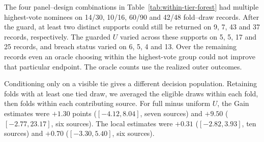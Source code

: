 The four panel--design combinations in Table~\ref{tab:within-tier-forest} had multiple highest-vote nominees on 14/30, 10/16, 60/90 and 42/48 fold--draw records. After the guard, at least two distinct supports could still be returned on 9, 7, 43 and 37 records, respectively. The guarded $U$ varied across these supports on 5, 5, 17 and 25 records, and breach status varied on 6, 5, 4 and 13. Over the remaining records even an oracle choosing within the highest-vote group could not improve that particular endpoint. The oracle counts use the realized outer outcomes.

Conditioning only on a visible tie gives a different decision population. Retaining folds with at least one tied draw, we averaged the eligible draws within each fold, then folds within each contributing source. For full minus uniform $U$, the Gain estimates were $+1.30$ points ($[-4.12,8.04]$, seven sources) and $+9.50$ ($[-2.77,23.17]$, six sources). The local estimates were $+0.31$ ($[-2.82,3.93]$, ten sources) and $+0.70$ ($[-3.30,5.40]$, six sources).
